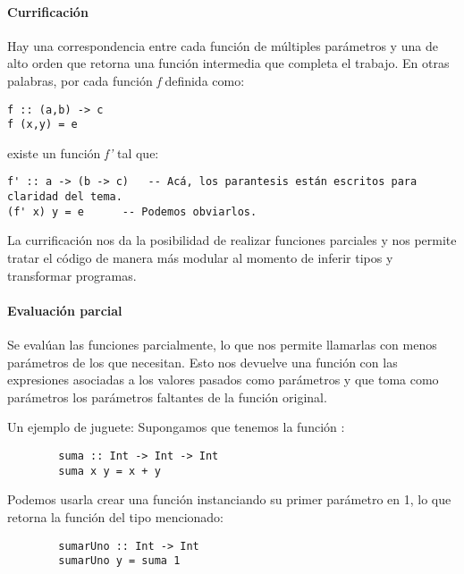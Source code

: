 \paragraph{Currificación} Hay una correspondencia entre cada función de múltiples parámetros y una de alto orden que retorna una función intermedia que completa el trabajo. En otras palabras, por cada función \textit{f} definida como:
\begin{centrado}
	\begin{verbatim}
f :: (a,b) -> c
f (x,y) = e
	\end{verbatim}
\end{centrado} 
existe un función \textit{f'} tal que:
\begin{centrado}
	\begin{verbatim}
f' :: a -> (b -> c)   -- Acá, los parantesis están escritos para claridad del tema.
(f' x) y = e	  -- Podemos obviarlos.
	\end{verbatim}
\end{centrado} 

La currificación nos da la posibilidad de realizar funciones parciales y nos permite tratar el código de manera más modular al momento de inferir tipos y transformar programas.

\paragraph{Evaluación parcial} Se evalúan las funciones parcialmente, lo que nos permite llamarlas con menos parámetros de los que necesitan. Esto nos devuelve una función con las expresiones asociadas a los valores pasados como parámetros y que toma como parámetros los parámetros faltantes de la función original.

Un ejemplo de juguete: Supongamos que tenemos la función :

\begin{centrado}
	\begin{verbatim}
		suma :: Int -> Int -> Int
		suma x y = x + y
	\end{verbatim}
\end{centrado} 

Podemos usarla crear una función  instanciando su primer parámetro en 1, lo que retorna la función del tipo mencionado:

\begin{centrado}
	\begin{verbatim}
		sumarUno :: Int -> Int
		sumarUno y = suma 1
	\end{verbatim}
\end{centrado} 


